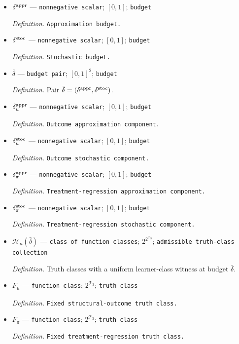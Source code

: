 \documentclass{article}
\begin{document}
\begin{itemize}
  \item \(\delta^{\rm appr}\) --- \texttt{nonnegative scalar}; \([0,1]\); \texttt{budget}
  \par\smallskip\noindent\emph{Definition.} \texttt{Approximation budget.}
  \item \(\delta^{\rm stoc}\) --- \texttt{nonnegative scalar}; \([0,1]\); \texttt{budget}
  \par\smallskip\noindent\emph{Definition.} \texttt{Stochastic budget.}
  \item \(\bar\delta\) --- \texttt{budget pair}; \([0,1]^2\); \texttt{budget}
  \par\smallskip\noindent\emph{Definition.} Pair \(\bar\delta=(\delta^{\rm appr},\delta^{\rm stoc})\).
  \item \(\delta_\mu^{\rm appr}\) --- \texttt{nonnegative scalar}; \([0,1]\); \texttt{budget}
  \par\smallskip\noindent\emph{Definition.} \texttt{Outcome approximation component.}
  \item \(\delta_\mu^{\rm stoc}\) --- \texttt{nonnegative scalar}; \([0,1]\); \texttt{budget}
  \par\smallskip\noindent\emph{Definition.} \texttt{Outcome stochastic component.}
  \item \(\delta_\pi^{\rm appr}\) --- \texttt{nonnegative scalar}; \([0,1]\); \texttt{budget}
  \par\smallskip\noindent\emph{Definition.} \texttt{Treatment-\allowbreak{}regression approximation component.}
  \item \(\delta_\pi^{\rm stoc}\) --- \texttt{nonnegative scalar}; \([0,1]\); \texttt{budget}
  \par\smallskip\noindent\emph{Definition.} \texttt{Treatment-\allowbreak{}regression stochastic component.}
  \item \(\mathcal H_n(\bar\delta)\) --- \texttt{class of function classes}; \(2^{2^{\mathcal T_3}}\); \texttt{admissible truth-\allowbreak{}class collection}
  \par\smallskip\noindent\emph{Definition.} Truth classes with a uniform learner-class witness at budget \(\bar\delta\).
  \item \(F_\mu\) --- \texttt{function class}; \(2^{\mathcal T_3}\); \texttt{truth class}
  \par\smallskip\noindent\emph{Definition.} \texttt{Fixed structural-\allowbreak{}outcome truth class.}
  \item \(F_\pi\) --- \texttt{function class}; \(2^{\mathcal T_3}\); \texttt{truth class}
  \par\smallskip\noindent\emph{Definition.} \texttt{Fixed treatment-\allowbreak{}regression truth class.}

\end{itemize}
\end{document}
